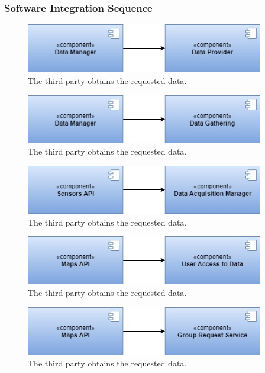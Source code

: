 \subsubsection{Software Integration Sequence}
\begin{figure}
    \centering
    \includegraphics[width=295pt]{images/IntegrationSequence/TrackMe-Integration_sequence1.jpg}
    \caption{The third party obtains the requested data.}
\end{figure}
\begin{figure}
    \centering
    \includegraphics[width=295pt]{images/IntegrationSequence/TrackMe-Integration_sequence2.jpg}
    \caption{The third party obtains the requested data.}
\end{figure}
\begin{figure}
    \centering
    \includegraphics[width=295pt]{images/IntegrationSequence/TrackMe-Integration_sequence3.jpg}
    \caption{The third party obtains the requested data.}
\end{figure}
\begin{figure}
    \centering
    \includegraphics[width=295pt]{images/IntegrationSequence/TrackMe-Integration_sequence4.jpg}
    \caption{The third party obtains the requested data.}
\end{figure}
\begin{figure}
    \centering
    \includegraphics[width=295pt]{images/IntegrationSequence/TrackMe-Integration_sequence5.jpg}
    \caption{The third party obtains the requested data.}
\end{figure}
